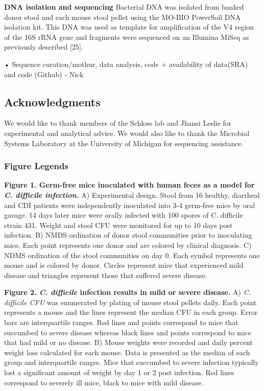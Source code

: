 \documentclass[11pt,]{article}
\begin{document}
\textbf{DNA isolation and sequencing} Bacterial DNA was isolated from
banked donor stool and each mouse stool pellet using the MO-BIO
PowerSoil DNA isolation kit. This DNA was used as template for
amplification of the V4 region of the 16S rRNA gene and fragments were
sequenced on an Illumina MiSeq as previously described {[}25{]}.

• Sequence curation/mothur, data analysis, code + availability of
data(SRA) and code (Github) - Nick

\subsection{Acknowledgments}\label{acknowledgments}

We would like to thank members of the Schloss lab and Jhansi Leslie for
experimental and analytical advice. We would also like to thank the
Microbial Systems Laboratory at the University of Michigan for
sequencing assistance.

\newpage

\subsubsection{Figure Legends}\label{figure-legends}

\textbf{Figure 1. Germ-free mice inoculated with human feces as a model
for \emph{C. difficile infection.}} A) Experimental design. Stool from
16 healthy, diarrheal and CDI patients were independently inoculated
into 3-4 germ-free mice by oral gavage. 14 days later mice were orally
infected with 100 spores of C. difficile strain 431. Weight and stool
CFU were monitored for up to 10 days post infection. B) NMDS ordination
of donor stool communities prior to inoculating mice. Each point
represents one donor and are colored by clinical diagnosis. C) NDMS
ordination of the stool communities on day 0. Each symbol represents one
mouse and is colored by donor. Circles represent mice that experienced
mild disease and triangles represent those that suffered severe disease.

\textbf{Figure 2. \emph{C. difficile} infection results in mild or
severe disease.} A) \emph{C. difficile CFU} was enumerated by plating of
mouse stool pellets daily. Each point represents a mouse and the lines
represent the median CFU in each group. Error bars are interquartile
ranges. Red lines and points correspond to mice that succumbed to severe
disease whereas black lines and points correspond to mice that had mild
or no disease. B) Mouse weights were recorded and daily percent weight
loss calculated for each mouse. Data is presented as the median of each
group and interquartile ranges. Mice that succumbed to severe infection
typically lost a significant amount of weight by day 1 or 2 post
infection. Red lines correspond to severely ill mice, black to mice with
mild disease.
\end{document}
